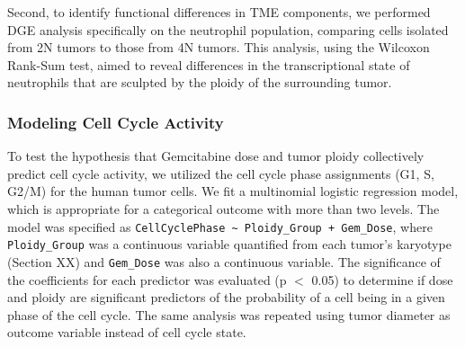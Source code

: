 \documentclass[11pt,notitlepage]{article}
\begin{document}
Second, to identify functional differences in TME components, we performed DGE analysis specifically on the neutrophil population, comparing cells isolated from 2N tumors to those from 4N tumors. This analysis, using the Wilcoxon Rank-Sum test, aimed to reveal differences in the transcriptional state of neutrophils that are sculpted by the ploidy of the surrounding tumor.

\subsubsection{Modeling Cell Cycle Activity}
To test the hypothesis that Gemcitabine dose and tumor ploidy collectively predict cell cycle activity, we utilized the cell cycle phase assignments (G1, S, G2/M) for the human tumor cells. We fit a multinomial logistic regression model, which is appropriate for a categorical outcome with more than two levels. \color{blue} The model was specified as \texttt{CellCyclePhase \textasciitilde{} Ploidy\_Group + Gem\_Dose}, where \texttt{Ploidy\_Group} was a continuous variable quantified from each tumor's karyotype (Section XX) and \texttt{Gem\_Dose} was also a continuous variable. The significance of the coefficients for each predictor was evaluated (p $<$ 0.05) to determine if dose and ploidy are significant predictors of the probability of a cell being in a given phase of the cell cycle. The same analysis was repeated using tumor diameter as outcome variable instead of cell cycle state.\color{black}
\end{document}
